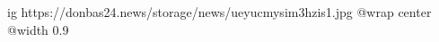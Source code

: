  
 
 
 
 

\ifcmt
  ig https://donbas24.news/storage/news/ueyucmysim3hzis1.jpg
  @wrap center
  @width 0.9
\fi
